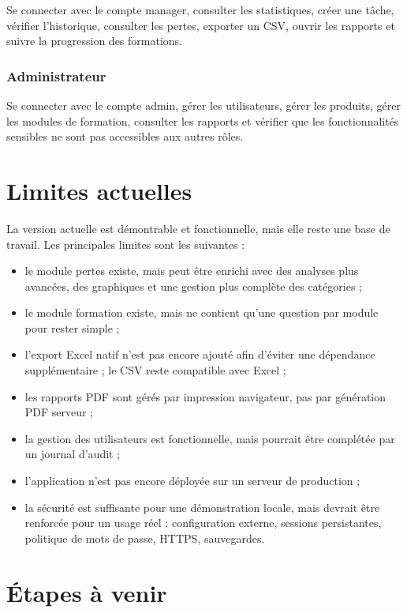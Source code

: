 \documentclass[11pt,a4paper]{article}
\begin{document}
Se connecter avec le compte manager, consulter les statistiques, créer une tâche, vérifier l'historique, consulter les pertes, exporter un CSV, ouvrir les rapports et suivre la progression des formations.

\subsubsection*{Administrateur}

Se connecter avec le compte admin, gérer les utilisateurs, gérer les produits, gérer les modules de formation, consulter les rapports et vérifier que les fonctionnalités sensibles ne sont pas accessibles aux autres rôles.

\section{Limites actuelles}

La version actuelle est démontrable et fonctionnelle, mais elle reste une base de travail. Les principales limites sont les suivantes :

\begin{itemize}
  \item le module pertes existe, mais peut être enrichi avec des analyses plus avancées, des graphiques et une gestion plus complète des catégories ;
  \item le module formation existe, mais ne contient qu'une question par module pour rester simple ;
  \item l'export Excel natif n'est pas encore ajouté afin d'éviter une dépendance supplémentaire ; le CSV reste compatible avec Excel ;
  \item les rapports PDF sont gérés par impression navigateur, pas par génération PDF serveur ;
  \item la gestion des utilisateurs est fonctionnelle, mais pourrait être complétée par un journal d'audit ;
  \item l'application n'est pas encore déployée sur un serveur de production ;
  \item la sécurité est suffisante pour une démonstration locale, mais devrait être renforcée pour un usage réel : configuration externe, sessions persistantes, politique de mots de passe, HTTPS, sauvegardes.
\end{itemize}

\section{Étapes à venir}
\end{document}
